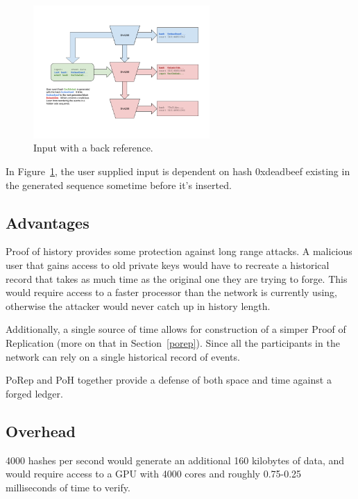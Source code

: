 \documentclass[12pt]{article}
\begin{document}
\begin{figure}
  \begin{center}
    \centering
    \includegraphics[width=0.6\textwidth]{figures/fig_6.png}
    \caption[Fig 6]{Input with a back reference.\label{fig:poh_consistency}}
  \end{center}
  \end{figure}

In Figure~\ref{fig:poh_consistency}, the user supplied input is dependent on hash 0xdeadbeef existing in the generated sequence sometime before it’s inserted.
\subsection{Advantages}

Proof of history provides some protection against long range attacks.  A malicious user that gains access to old private keys would have to recreate a historical record that takes as much time as the original one they are trying to forge.  This would require access to a faster processor than the network is currently using, otherwise the attacker would never catch up in history length.

Additionally, a single source of time allows for construction of a simper Proof of Replication (more on that in Section~\ref{porep}).  Since all the participants in the network can rely on a single historical record of events.

PoRep and PoH together provide a defense of both space and time against a forged ledger.

\subsection{Overhead}
4000 hashes per second would generate an additional 160 kilobytes of data, and would require access to a GPU with 4000 cores and roughly 0.75-0.25 milliseconds of time to verify.
\end{document}
